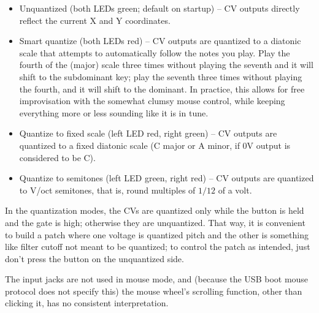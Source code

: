 \begin{itemize}
  \item Unquantized (both LEDs green; default on startup) -- CV outputs
    directly reflect the current X and Y coordinates.
  \item Smart quantize (both LEDs red) -- CV outputs are quantized to a
    diatonic scale that attempts to automatically follow the notes you play. 
    Play the fourth of the (major) scale three times without playing the
    seventh and it will shift to the subdominant key; play the seventh three
    times without playing the fourth, and it will shift to the dominant.  In
    practice, this allows for free improvisation with the somewhat clumsy
    mouse control, while keeping everything more or less sounding like it is
    in tune.
  \item Quantize to fixed scale (left LED red, right green) -- CV outputs
    are quantized to a fixed diatonic scale (C major or A minor, if 0V
    output is considered to be C).
  \item Quantize to semitones (left LED green, right red) -- CV outputs are
    quantized to V/oct semitones, that is, round multiples of $1/12$ of a
    volt.
\end{itemize}

In the quantization modes, the CVs are quantized only while the button is
held and the gate is high; otherwise they are unquantized.  That way, it is
convenient to build a patch where one voltage is quantized pitch and the
other is something like filter cutoff not meant to be quantized; to control
the patch as intended, just don't press the button on the unquantized side.

The input jacks are not used in mouse mode, and (because the USB boot mouse
protocol does not specify this) the mouse wheel's scrolling
function, other than clicking it, has no consistent interpretation.
